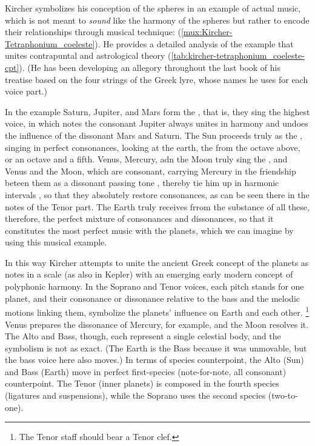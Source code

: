 Kircher symbolizes his conception of the spheres in an example of actual music,
which is not meant to \emph{sound} like the harmony of the spheres but rather to
encode their relationships through musical technique:
 (\cref{mux:Kircher-Tetraphonium_coeleste}).%
    \Autocite[, 383]{Kircher:Musurgia}
He provides a detailed analysis of the example that unites contrapuntal and
astrological theory (\cref{tab:kircher-tetraphonium_coeleste-cpt}).
(He has been developing an allegory throughout the last book of his treatise
based on the four strings of the Greek lyre, whose names he uses for each voice
part.)
\begin{quoting}
	In the example Saturn, Jupiter, and Mars form the , that
	is, they sing the highest voice, in which notes the consonant Jupiter
	always unites in harmony  and undoes the influence of
	 the dissonant Mars and Saturn.
	The Sun proceeds truly as the  , singing in
	perfect consonances, looking at the earth, the 
	 from the octave above, or an octave and a fifth.
	Venus, Mercury, adn the Moon truly sing the 
	, and Venus and the Moon, which are consonant, carrying
	Mercury in the friendship beteen them as a dissonant passing tone
	, thereby tie him up in harmonic
	intervals , so that they absolutely restore
	consonances, as can be seen there in the notes of the Tenor part.
	The Earth truly receives frrom the substance of all these, therefore,
	the perfect mixture of consonances and dissonances, so that it
        constitutes the most perfect music with the planets, which we can
        imagine by using this musical example.%
            \Autocite[, 383--384]{Kircher:Musurgia}
\end{quoting}
In this way Kircher attempts to unite the ancient Greek concept of the planets
as notes in a scale (as also in Kepler) with an emerging early modern concept of
polyphonic harmony.
In the Soprano and Tenor voices, each pitch stands for one planet, and their
consonance or dissonance relative to the bass and the melodic motions linking
them, symbolize the planets' influence on Earth and each other.%
    \footnote{The Tenor staff should bear a Tenor clef.}
Venus prepares the dissonance of Mercury, for example, and the Moon resolves it.
The Alto and Bass, though, each represent a single celestial body, and the
symbolism is not as exact.
(The Earth is the Bass because it was unmovable, but the bass voice here also
moves.)
In terms of species counterpoint, the Alto (Sun) and Bass (Earth) move in
perfect first-species (note-for-note, all consonant) counterpoint.
The Tenor (inner planets) is composed in the fourth species (ligatures and
suspensions), while the Soprano uses the second species (two-to-one).

